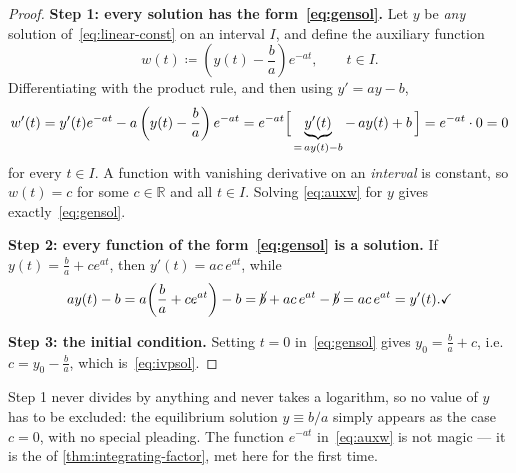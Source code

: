 \begin{proof}
	\textbf{Step 1: every solution has the form~\eqref{eq:gensol}.}
	Let \(y\) be \emph{any} solution of~\eqref{eq:linear-const} on an interval \(I\), and
	define the auxiliary function
	\begin{equation}\label{eq:auxw}
		w(t) \coloneq \left( y(t) - \frac{b}{a} \right) e^{-at},
		\qquad t \in I.
	\end{equation}
	Differentiating with the product rule, and then using \(y' = ay - b\),
	\[
		w'(t)
		= y'(t) e^{-at} - a\left( y(t) - \frac{b}{a} \right) e^{-at}
		= e^{-at}\Bigl[\, \underbrace{y'(t)}_{=\,ay(t)-b} - \,a y(t) + b \,\Bigr]
		= e^{-at} \cdot 0 = 0
	\]
	for every \(t \in I\). A function with vanishing derivative on an \emph{interval} is
	constant, so \(w(t) = c\) for some \(c \in \mathbb{R}\) and all \(t \in I\). Solving
	\eqref{eq:auxw} for \(y\) gives exactly~\eqref{eq:gensol}.

	\textbf{Step 2: every function of the form~\eqref{eq:gensol} is a solution.}
	If \(y(t) = \frac ba + ce^{at}\), then \(y'(t) = ac\,e^{at}\), while
	\[
		ay(t) - b = a\!\left( \frac{b}{a} + c e^{at} \right) - b
		= \cancel{b} + ac\,e^{at} - \cancel{b} = ac\,e^{at} = y'(t). \checkmark
	\]

	\textbf{Step 3: the initial condition.} Setting \(t = 0\) in~\eqref{eq:gensol} gives
	\(y_0 = \frac ba + c\), i.e.\ \(c = y_0 - \frac ba\), which is~\eqref{eq:ivpsol}.
\end{proof}

\begin{remark}
	Step 1 never divides by anything and never takes a logarithm, so no value of \(y\) has
	to be excluded: the equilibrium solution \(y \equiv b/a\) simply appears as the case
	\(c = 0\), with no special pleading. The function \(e^{-at}\)
	in~\eqref{eq:auxw} is not magic --- it is the  of
	\autoref{thm:integrating-factor}, met here for the first time.
\end{remark}

